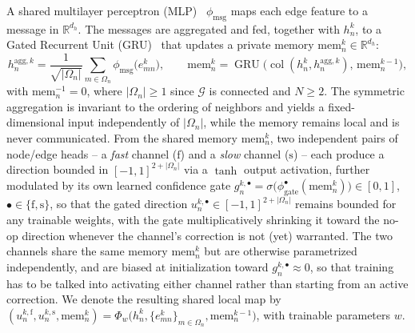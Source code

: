 \documentclass[final]{l4dc2026}
\begin{document}
A shared multilayer perceptron (MLP)~\citep{taud2017multilayer} $\phi_{\mathrm{msg}}$ maps each edge feature to a message in $\mathbb{R}^{d_h}$. The messages are aggregated and fed, together with $h_n^k$, to a Gated Recurrent Unit (GRU)~\citep{cho2014learning} that updates a private memory $\mathrm{mem}_n^k\in\mathbb{R}^{d_h}$:
\begin{equation}
  h_n^{\mathrm{agg},k} = \frac{1}{\sqrt{|\Omega_n|}}\sum_{m\in\Omega_n}\phi_{\mathrm{msg}}\big(e_{mn}^k\big),
  \qquad
  \mathrm{mem}_n^k = \operatorname{GRU}\big(\operatorname{col}(h_n^k, h_n^{\mathrm{agg},k}),\, \mathrm{mem}_n^{k-1}\big),
  \label{eq:gnn}
\end{equation}
with $\mathrm{mem}_n^{-1}=0$, where $|\Omega_n|\geq1$ since $\mathcal G$ is connected and $N\geq 2$. The symmetric aggregation is invariant to the ordering of neighbors and yields a fixed-dimensional input independently of $|\Omega_n|$, while the memory remains local and is never communicated. From the shared memory $\mathrm{mem}_n^k$, two independent pairs of node/edge heads -- a \emph{fast} channel ($\mathrm f$) and a \emph{slow} channel ($\mathrm s$) -- each produce a direction bounded in $[-1,1]^{2+|\Omega_n|}$ via a $\tanh$ output activation, further modulated by its own learned confidence gate $g_n^{k,\bullet} = \sigma\big(\phi_{\mathrm{gate}}^{\bullet}(\mathrm{mem}_n^k)\big)\in[0,1]$, $\bullet\in\{\mathrm f,\mathrm s\}$, so that the gated direction $u_n^{k,\bullet}\in[-1,1]^{2+|\Omega_n|}$ remains bounded for any trainable weights, with the gate multiplicatively shrinking it toward the no-op direction whenever the channel's correction is not (yet) warranted. The two channels share the same memory $\mathrm{mem}_n^k$ but are otherwise parametrized independently, and are biased at initialization toward $g_n^{k,\bullet}\approx 0$, so that training has to be talked into activating either channel rather than starting from an active correction. We denote the resulting shared local map by $(u_n^{k,\mathrm f},u_n^{k,\mathrm s},\mathrm{mem}_n^k)=\Phi_w\big(h_n^k,\{e_{mn}^k\}_{m\in\Omega_n},\mathrm{mem}_n^{k-1}\big)$, with trainable parameters $w$.
\end{document}
